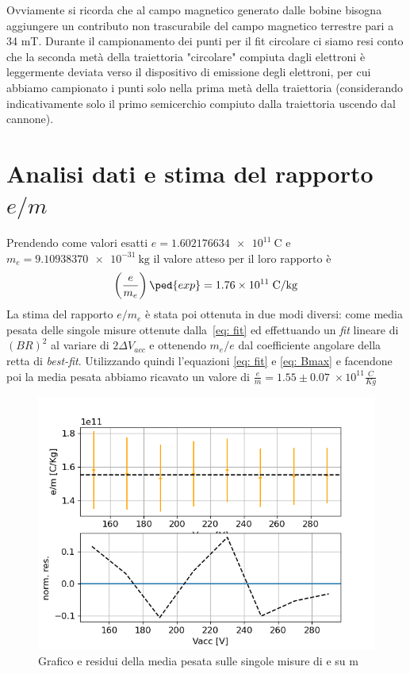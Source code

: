 \documentclass[10pt, a4paper, italian]{article}
\begin{document}
Ovviamente si ricorda che al campo magnetico generato dalle bobine bisogna aggiungere un contributo non trascurabile del campo magnetico terrestre pari a 34 mT.
Durante il campionamento dei punti per il fit circolare ci siamo resi conto che la seconda metà della traiettoria "circolare" compiuta dagli elettroni è leggermente deviata verso il dispositivo di emissione degli elettroni, per cui abbiamo campionato i punti solo nella prima metà della traiettoria (considerando indicativamente solo il primo semicerchio compiuto dalla traiettoria uscendo dal cannone).
\section{Analisi dati e stima del rapporto $e/m$}
Prendendo come valori esatti $e = \SI{1.602176634e11}{\coulomb}$ e
$m_{e} = \SI{9.10938370e-31}{\kilogram}$ il valore atteso per il loro
rapporto è
\begin{equation}\label{eq: e-m-exp}
\left(\frac{e}{m_{e}}\right)\ped{exp} = 1.76\times 10^{11}\; \si{\coulomb/\kilogram}
\end{equation}
La stima del rapporto $ e/m_{e} $ è stata poi ottenuta in due modi diversi:
come media pesata delle singole misure ottenute dalla~\eqref{eq: fit} ed
effettuando un \emph{fit} lineare di $ (BR)^2 $ al variare di
$ 2 \Delta V_{acc} $ e ottenendo $ m_e/e $ dal coefficiente angolare della retta
di \emph{best-fit}.
Utilizzando quindi l'equazioni \ref{eq: fit} e \ref{eq: Bmax} e facendone poi la media pesata abbiamo ricavato un valore di $\frac{e}{m}=1.55 \pm 0.07 \; \times 10^{11} \frac{C}{Kg}$ 
\begin{figure}
\includegraphics[width=\textwidth]{medpes}
\caption{Grafico e residui della media pesata sulle singole misure di e su m}
\end{figure}
\end{document}
